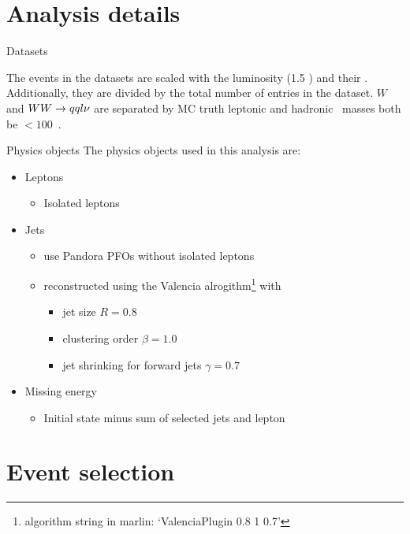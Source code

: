 \documentclass{beamer}
\newcommand{\texpath}{../analysis/tex/}
\begin{document}
\section{Analysis details}

\begin{frame}{Datasets}

\vspace{-0.5cm}
The events in the datasets are scaled with the luminosity (1.5 \invab) and their \xsec.
%
Additionally, they are divided by the total number of entries in the dataset.
%
$W$ and $WW\rightarrow qql\nu$ are separated by MC truth leptonic and hadronic \Wboson\ masses both be $< 100$~\GeV.
\end{frame}


\begin{frame}{Physics objects}
The physics objects used in this analysis are:
\begin{itemize}
  \item Leptons
  \begin{itemize}
    \item Isolated leptons
  \end{itemize}
  \item Jets
  \begin{itemize}
    \item use Pandora PFOs without isolated leptons
    \item reconstructed using the Valencia alrogithm\footnote{algorithm string in marlin: `ValenciaPlugin 0.8 1 0.7'} with
    \begin{itemize}
      \item jet size $R=0.8$
      \item clustering order $\beta=1.0$
      \item jet shrinking for forward jets $\gamma=0.7$
    \end{itemize}
  \end{itemize}
  \item Missing energy
  \begin{itemize}
    \item Initial state minus sum of selected jets and lepton
  \end{itemize}
\end{itemize}
\end{frame}










\section{Event selection}
\end{document}
